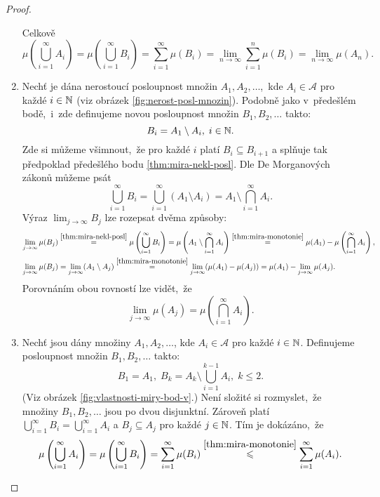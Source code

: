 \begin{proof}
\begin{enumerate}[label=\textit{(\roman*)}]
        Celkově
        \[\mu\left(\bigcup_{i=1}^\infty A_i\right)=\mu\left(\bigcup_{i=1}^\infty B_i\right)=\sum_{i=1}^{\infty}\mu(B_i)=\lim_{n\to\infty}\sum_{i=1}^{n}\mu(B_i)=\lim_{n\to\infty}\mu(A_n).\]
        \item Nechť je dána nerostoucí posloupnost množin $A_1,A_2,\ldots$,~kde $A_i\in\mathcal{A}$ pro každé $i\in\mathbb{N}$ (viz obrázek \ref{fig:nerost-posl-mnozin}). Podobně jako v~předešlém bodě,~i~zde definujeme novou posloupnost množin $B_1,B_2,\ldots$ takto:
        \[B_i=A_1\setminus A_i,\;i\in\mathbb{N}.\]
        Zde si můžeme všimnout,~že pro každé $i$ platí $B_i\subseteq B_{i+1}$ a splňuje tak předpoklad předešlého bodu \ref{thm:mira-nekl-posl}. Dle De Morganových zákonů můžeme psát
        \[\bigcup_{i=1}^\infty B_i=\bigcup_{i=1}^\infty(A_1\setminus A_i)=A_1\setminus\bigcap_{i=1}^\infty A_i.\]
        Výraz $\lim_{j\to\infty}B_j$ lze rozepsat dvěma způsoby:
        \begin{align*}
            \lim\limits_{j\to\infty}\mu(B_j)&\stackrel{\ref{thm:mira-nekl-posl}}{=}\mu\left(\bigcup\limits_{i=1}^\infty B_i\right)=\mu\left(A_1\setminus\bigcap\limits_{i=1}^\infty A_i\right)\stackrel{\ref{thm:mira-monotonie}}{=}\mu(A_1)-\mu\left(\bigcap\limits_{i=1}^\infty A_i\right),\\
            \lim\limits_{j\to\infty}\mu(B_j)&=\lim_{j\to\infty}(A_1\setminus A_j)\stackrel{\ref{thm:mira-monotonie}}{=}\lim_{j\to\infty}(\mu(A_1)-\mu(A_j))=\mu(A_1)-\lim_{j\to\infty}\mu(A_j).
        \end{align*}
        Porovnáním obou rovností lze vidět,~že
        \[\lim_{j\to\infty}\mu(A_j)=\mu\left(\bigcap\limits_{i=1}^\infty A_i\right).\]
        \item Nechť jsou dány množiny $A_1,A_2,\ldots$, kde $A_i\in\mathcal{A}$ pro každé $i\in\mathbb{N}$. Definujeme posloupnost množin $B_1,B_2,\ldots$ takto:
        \[B_1=A_1,\;B_k=A_k\setminus\bigcup_{i=1}^{k-1} A_i,\;k\leqslant 2.\]
        (Viz obrázek \ref{fig:vlastnosti-miry-bod-v}.) Není složité si rozmyslet,~že množiny $B_1,B_2,\ldots$ jsou po dvou disjunktní. Zároveň platí $\bigcup_{i=1}^\infty B_i=\bigcup_{i=1}^\infty A_i$ a $B_j\subseteq A_j$ pro každé $j\in\mathbb{N}$. Tím je dokázáno,~že
        \[\mu\left(\bigcup_{i=1}^\infty A_i\right)=\mu\left(\bigcup_{i=1}^\infty B_i\right)=\sum_{i=1}^{\infty}\mu(B_i)\stackrel{\ref{thm:mira-monotonie}}{\leqslant}\sum_{i=1}^{\infty}\mu(A_i).\]
    \end{enumerate}
    \begin{figure}[h]
        \centering
        \begin{subfigure}{0.45\textwidth}

\end{subfigure}
\end{figure}
\end{proof}
